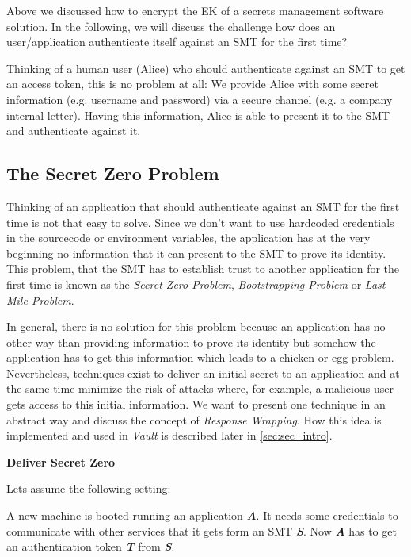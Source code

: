 \documentclass[runningheads]{llncs}
\begin{document}
Above we discussed how to encrypt the EK of a secrets management software solution. In the following, we will discuss the challenge how does an user/application authenticate itself against an SMT for the first time?

Thinking of a human user (Alice) who should authenticate against an SMT to get an access token, this is no problem at all: We provide Alice with some secret information (e.g. username and password) via a secure channel (e.g. a company internal letter). Having this information, Alice is able to present it to the SMT and authenticate against it.

\subsection{The Secret Zero Problem}

Thinking of an application that should authenticate against an SMT for the first time is not that easy to solve. Since we don't want to use hardcoded credentials in the sourcecode or environment variables, the application has at the very beginning no information that it can present to the SMT to prove its identity. This problem, that the SMT has to establish trust to another application for the first time is known as the \textit{Secret Zero Problem}, \textit{Bootstrapping Problem} or \textit{Last Mile Problem}.

In general, there is no solution for this problem because an application has no other way than providing information to prove its identity but somehow the application has to get this information which leads to a chicken or egg problem.
Nevertheless, techniques exist to deliver an initial secret to an application and at the same time minimize the risk of attacks where, for example, a malicious user gets access to this initial information. We want to present one technique in an abstract way and discuss the concept of \textit{Response Wrapping}. How this idea is implemented and used in \textit{Vault} is described later in \autoref{sec:sec_intro}. \newline

\noindent
\textbf{Deliver Secret Zero} \newline
\noindent

\noindent
Lets assume the following setting:

\noindent
A new machine is booted running an application \textbf{\textit{A}}.
It needs some credentials to communicate with other services that it gets form an SMT \textbf{\textit{S}}. Now \textbf{\textit{A}} has to get an authentication token \textbf{\textit{T}} from \textbf{\textit{S}}.
\end{document}
